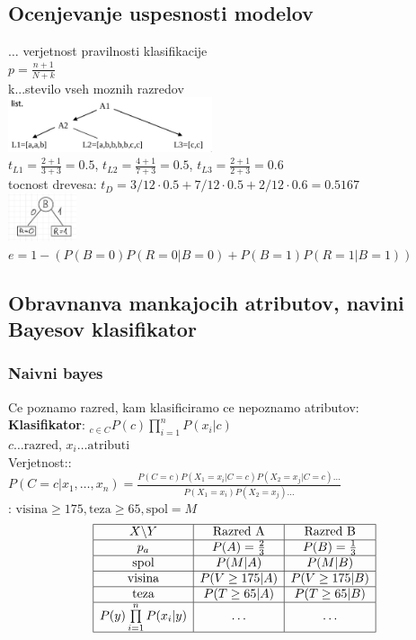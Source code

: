 \subsection{Ocenjevanje uspesnosti modelov}
 $\dots$ verjetnost pravilnosti klasifikacije\\
 $p=\frac{n+1}{N+k}$\\
k...stevilo vseh moznih razredov\\
\includegraphics[width=6cm]{./images/drevo-laplace.png}\\
$t_{L1}=\frac{2+1}{3+3}=0.5$,
$t_{L2}=\frac{4+1}{7+3}=0.5$,
$t_{L3}=\frac{2+1}{2+3}=0.6$\\
tocnost drevesa: $t_D=3/12\cdot 0.5 + 7/12\cdot 0.5 + 2/12\cdot 0.6=0.5167$\\
\includegraphics[width=2cm]{./images/klasifikacijska-napaka.png}\\
$e=1-(P(B=0)P(R=0|B=0)+P(B=1)P(R=1|B=1))$

\subsection{Obravnanva mankajocih atributov, navini Bayesov klasifikator}
\subsubsection{Naivni bayes}
Ce poznamo razred, kam klasificiramo ce nepoznamo atributov:\\
\textbf{Klasifikator}: $_{c\in C} P(c)\prod\limits_{i=1}^n P(x_i|c)$\\
$c\dots \text{razred}$, $x_i\dots \text{atributi}$\\
Verjetnost::\\
$P(C=c|x_1,\dots,x_n)=\frac{P(C=c)P(X_1=x_i|C=c)P(X_2=x_j|C=c)\dots}{P(X_1=x_i)P(X_2=x_j)\dots}$\\

: $\text{visina}\geq175, \text{teza}\geq 65, \text{spol}=M$
$$
\begin{array}{|c|c|c|}
    \hline
    X\backslash Y   & \text{Razred A}      & \text{Razred B}\\
    \hline
    p_a           & P(A) = \frac{2}{3}    & P(B) = \frac{1}{3}\\
    \hline
    \text{spol}   & P(M|A) & P(M|B)\\
    \hline
    \text{visina} & P(V\geq 175|A) & P(V\geq 175 | B)\\
    \hline
    \text{teza} & P(T\geq 65|A) & P(T\geq 65| B)\\
    \hline
    P(y)\prod\limits_{i=1}^n P(x_i|y) & \dots & \dots\\
    \hline
\end{array}
$$

